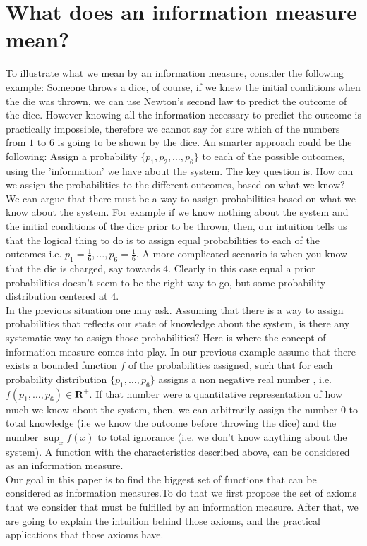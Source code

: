 \documentclass[11pt]{article}
\theoremstyle{plain}
\begin{document}
\section{What does an information measure mean?}
To illustrate what we mean by an information measure, consider the following example: Someone throws a dice, of course, if we knew the initial conditions when the die was thrown, we can use Newton's second law to predict the outcome of the dice. However knowing all the information necessary to predict the outcome  is practically impossible, therefore we cannot say for sure which of the numbers from $1$ to $6$  is going to be shown by the dice. An smarter approach could be the following: Assign a  probability $\{p_{1},p_{2},\ldots,p_{6}\}$ to each  of the possible outcomes, using the 'information' we have about the system. The key question is. How can we  assign the probabilities to the different outcomes, based on what we know?  We can argue that there must be a way to assign probabilities based on what we know about the system. For example if we know nothing about the system and the initial conditions of the dice prior to be thrown, then, our intuition tells us that the logical thing to do is to assign equal probabilities to each of the outcomes i.e. $p_{1}=\frac{1}{6},\ldots,p_{6}=\frac{1}{6}$. A more complicated scenario is when you know that the die is charged, say towards $4$. Clearly in this case equal a prior probabilities doesn't seem to be the right way to go, but some probability distribution centered at $4$. 
\medskip
\\
In the previous situation one may ask. Assuming that there is a way to assign probabilities that reflects our state of knowledge about the system, is there any systematic way to assign those probabilities? Here is where the concept of information measure comes into play. In our previous example assume that there exists a bounded function $f$ of the probabilities assigned, such that for each probability distribution $\{p_{1},\ldots,p_{6}\}$ assigns a non negative  real number , i.e. $f(p_{1},\ldots,p_{6})\in\mathbf{R^{+}}$. If that number were a quantitative representation of how much we know about the system, then, we can arbitrarily assign the number $0$ to total knowledge (i.e we know the outcome before throwing the dice) and the number $\sup_{x} f(x)$ to total ignorance (i.e. we don't know anything about the system).  A function with the characteristics described above, can be considered as an information measure.
\medskip
\\
Our goal in this paper is to find the biggest set of functions that can be considered as information measures.To do that we first propose the set of axioms that we consider that must be fulfilled by an information measure. After that, we are going to explain the intuition behind those axioms, and the practical applications that those axioms have.
\end{document}
